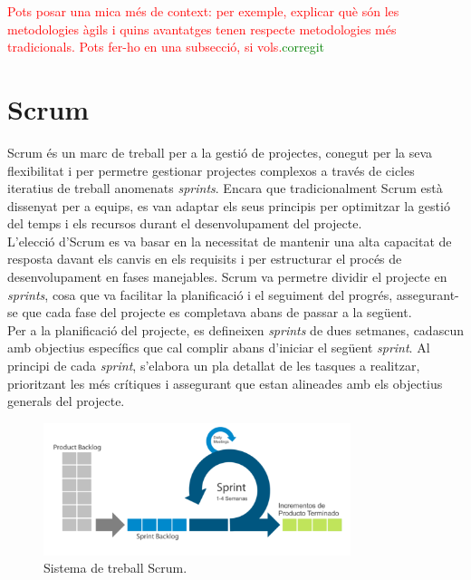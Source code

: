 \documentclass[a4paper,12pt,twoside]{ThesisStyle}
\newcommand{\pau}[1]{\textcolor{red}{#1}}
\newcommand{\sudan}[1]{\textcolor{green}{#1}}
\begin{document}
\pau{Pots posar una mica més de context: per exemple, explicar què són les metodologies àgils i quins avantatges tenen respecte metodologies més tradicionals. Pots fer-ho en una subsecció, si vols.}\sudan{corregit}

\section{Scrum}
\label{subsec: Scrum}

Scrum és un marc de treball per a la gestió de projectes, conegut per la seva flexibilitat i per permetre gestionar projectes complexos a través de cicles iteratius de treball anomenats \textit{sprints}. Encara que tradicionalment Scrum està dissenyat per a equips, es van adaptar els seus principis per optimitzar la gestió del temps i els recursos durant el desenvolupament del projecte.\\


L'elecció d'Scrum es va basar en la necessitat de mantenir una alta capacitat de resposta davant els canvis en els requisits i per estructurar el procés de desenvolupament en fases manejables. Scrum va permetre dividir el projecte en \textit{sprints}, cosa que va facilitar la planificació i el seguiment del progrés, assegurant-se que cada fase del projecte es completava abans de passar a la següent.\\

Per a la planificació del projecte, es defineixen \textit{sprints} de dues setmanes, cadascun amb objectius específics que cal complir abans d'iniciar el següent \textit{sprint}. Al principi de cada \textit{sprint}, s'elabora un pla detallat de les tasques a realitzar, prioritzant les més crítiques i assegurant que estan alineades amb els objectius generals del projecte.\\


\begin{figure}[h!] %
    \centering
    \includegraphics[width=0.8\textwidth]{imatges/scrum.png} %
    \caption{Sistema de treball Scrum.} %
    \label{fig:Sistema de treball Scrum} %
  \end{figure}
  
\end{document}
